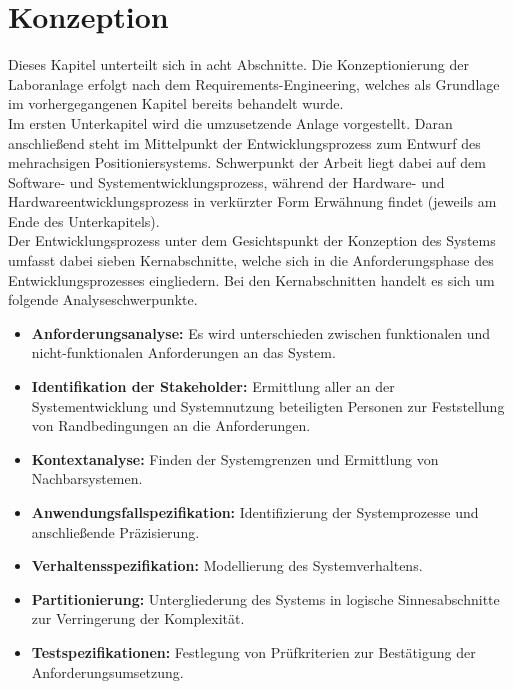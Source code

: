 \documentclass[../../Bachelorarbeit.tex]{subfiles}
\begin{document}
\section{Konzeption}
Dieses Kapitel unterteilt sich in acht Abschnitte. Die Konzeptionierung der Laboranlage erfolgt nach dem Requirements-Engineering, welches als Grundlage im vorhergegangenen Kapitel bereits behandelt wurde.\\
Im ersten Unterkapitel wird die umzusetzende Anlage vorgestellt. Daran anschließend steht im Mittelpunkt der Entwicklungsprozess zum Entwurf des mehrachsigen Positioniersystems. Schwerpunkt der Arbeit liegt dabei auf dem Software- und Systementwicklungsprozess, während der Hardware- und Hardwareentwicklungsprozess in verkürzter Form Erwähnung findet (jeweils am Ende des Unterkapitels).\\
Der Entwicklungsprozess unter dem Gesichtspunkt der Konzeption des Systems umfasst dabei sieben Kernabschnitte, welche sich in die Anforderungsphase des Entwicklungsprozesses eingliedern. Bei den Kernabschnitten handelt es sich um folgende Analyseschwerpunkte.\\
\begin{itemize}
    \item \textbf{Anforderungsanalyse:} Es wird unterschieden zwischen funktionalen und nicht-funktionalen Anforderungen an das System.
    \item \textbf{Identifikation der Stakeholder:} Ermittlung aller an der Systementwicklung und Systemnutzung beteiligten Personen zur Feststellung von Randbedingungen an die Anforderungen.
    \item \textbf{Kontextanalyse:} Finden der Systemgrenzen und Ermittlung von Nachbarsystemen.
    \item \textbf{Anwendungsfallspezifikation:} Identifizierung der Systemprozesse und anschließende Präzisierung.
    \item \textbf{Verhaltensspezifikation:} Modellierung des Systemverhaltens.
    \item \textbf{Partitionierung:} Untergliederung des Systems in logische Sinnesabschnitte zur Verringerung der Komplexität.
    \item \textbf{Testspezifikationen:} Festlegung von Prüfkriterien zur Bestätigung der Anforderungsumsetzung.
\end{itemize}
\end{document}
